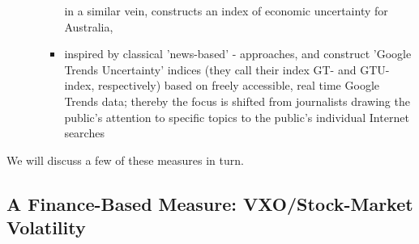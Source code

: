 \documentclass[a4paper,11pt,listof=nochaptergap,oneside,pointednumbers,bibtotoc,bigheadings,liststotoc]{scrbook}
\theoremstyle{mysatz}
\theoremstyle{mydefinition}
\theoremstyle{mybemerkung}
\begin{document}
\begin{itemize}
\begin{itemize}
\begin{itemize}
			in a similar vein, \citet{moore:17} constructs an index of economic uncertainty for Australia,
				\item inspired by classical 'news-based' - approaches, \citet{bontempietal:16} and \citet{castelnuovoandtran:17} construct 'Google Trends Uncertainty' indices (they call their index GT- and GTU-index, respectively) based on freely accessible, real time Google Trends data; thereby the focus is shifted from journalists drawing the public's attention to specific topics to the public's individual Internet searches
			\end{itemize}
		\end{itemize}
\end{itemize} 

We will discuss a few of these measures in turn.


\subsection{A Finance-Based Measure: VXO/Stock-Market Volatility}
\label{sec:bloomshock}
\end{document}
